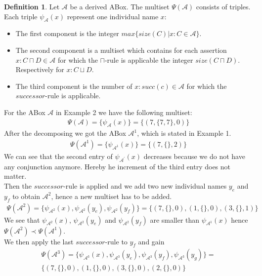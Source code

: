 \documentclass{book}
\theoremstyle{break}
\theoremstyle{definition}
\newtheorem{mydef}{Definition}
\begin{document}
\begin{mydef}
Let $\mathcal{A}$ be a derived ABox. The multiset $\Psi(\mathcal{A})$ consists of triples. Each triple $\psi_\mathcal{A}(x)$ represent one individual name $x$:
\begin{itemize}
\item The first component is the integer $max\{size(C)|x:C\in\mathcal{A}\}$.
\item The second component is a multiset which contains for each assertion $x:C\sqcap D\in\mathcal{A}$ for which the $\sqcap$-rule is applicable the integer $size(C\sqcap D)$. Respectively for $x:C\sqcup D$.
\item The third component is the number of $x:succ(c)\in\mathcal{A}$ for which the $successor$-rule is applicable.
\end{itemize}
\end{mydef}
For the ABox $\mathcal{A}$ in Example 2 we have the following multiset:
\begin{align*}
\Psi(\mathcal{A})=\{\psi_\mathcal{A}(x)\}=\{(7,\{7,7\},0)\}
\end{align*}
After the decomposing we got the ABox $\mathcal{A}^1$, which is stated in Example 1.
\begin{align*}
\Psi(\mathcal{A}^1)=\{\psi_{\mathcal{A}^1}(x)\}=\{(7,\{\},2)\}
\end{align*}
We can see that the second entry of $\psi_{\mathcal{A}^\prime}(x)$ decreases because we do not have any conjunction anymore. Hereby he increment of the third entry does not matter.\\
Then the $successor$-rule is applied and we add two new individual names $y_e$ and $y_f$ to obtain $\mathcal{A}^2$, hence a new multiset has to be added.
\begin{align*}
\Psi(\mathcal{A}^2)=\{\psi_{\mathcal{A}^2}(x),\psi_{\mathcal{A}^2}(y_e), \psi_{\mathcal{A}^2}(y_f)\}=\{(7,\{\},0),(1,\{\},0),(3,\{\},1)\}
\end{align*}
We see that $\psi_{\mathcal{A}^2}(x)$, $\psi_{\mathcal{A}^2}(y_e)$ and $\psi_{\mathcal{A}^2}(y_f)$ are smaller than $\psi_{\mathcal{A}^1}(x)$ hence $\Psi(\mathcal{A}^2)\prec \Psi(\mathcal{A}^1)$.\\
We then apply the last $successor$-rule to $y_f$ and gain
\begin{align*}
\Psi(\mathcal{A}^3)=\{\psi_{\mathcal{A}^3}(x),\psi_{\mathcal{A}^3}(y_e), \psi_{\mathcal{A}^3}(y_f),\psi_{\mathcal{A}^3}(y_g)\}=\\
\{(7,\{\},0),(1,\{\},0),(3,\{\},0),(2,\{\},0)\}
\end{align*}
\end{document}

